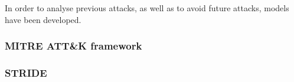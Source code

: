 In order to analyse previous attacks, as well as to avoid future attacks, models have been developed. 

\Cite{straub2020modeling}

 \subsubsection{MITRE ATT\&K framework}
 
 
 \Cite{strom2018mitre}
\subsubsection{STRIDE}

\cite{khan2017stride}
